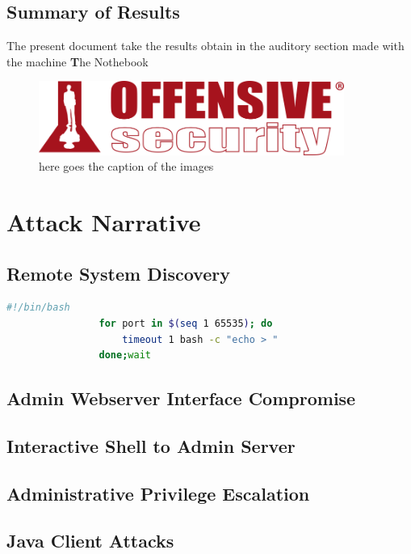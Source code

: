 \documentclass[a4paper]{article}
\newcommand{\machinename}{The Nothebook} %
\begin{document}
        \subsection{Summary of Results }
            The present document take the results obtain in the auditory section made with the 
            machine {\textbf\machinename}
            \vspace{0.2cm}
            \begin{figure}[h]
                \centering
                \includegraphics[width=10cm]{imagenes/offensive-security-logo.png}
                \caption{here goes the caption of the images}
            \end{figure}
        

    \section{Attack Narrative}
        \subsection{Remote System Discovery}        

            \begin{lstlisting}[language=Bash, caption=Script de algo]
                #!/bin/bash
                for port in $(seq 1 65535); do 
                    timeout 1 bash -c "echo > "
                done;wait
            \end{lstlisting}
        \subsection{Admin Webserver Interface Compromise}
        \subsection{Interactive Shell to Admin Server}
        \subsection{Administrative Privilege Escalation}
        \subsection{Java Client Attacks}
\end{document}
